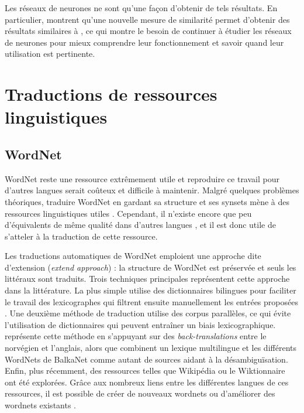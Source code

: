 
Les réseaux de neurones ne sont qu'une façon d'obtenir de tels résultats. En
particulier, \cite{levy2014linguistic} montrent qu'une nouvelle mesure de
similarité permet d'obtenir des résultats similaires à
\cite{mikolov2013efficient}, ce qui montre le besoin de continuer à étudier les
réseaux de neurones pour mieux comprendre leur fonctionnement et savoir quand
leur utilisation est pertinente.

\section{Traductions de ressources linguistiques}
\label{sec:translation}

\subsection{WordNet}

WordNet reste une ressource extrêmement utile et reproduire ce travail pour
d'autres langues serait coûteux et difficile à maintenir. Malgré quelques
problèmes théoriques, traduire WordNet en gardant sa structure et ses synsets
mène à des ressources linguistiques utiles
\citep{fellbaum2007connecting,demelo2008utility}. Cependant, il n'existe encore
que peu d'équivalents de même qualité dans d'autres langues
\citep{bond2012survey}, et il est donc utile de s'atteler à la traduction de
cette ressource.

Les traductions automatiques de WordNet emploient une approche dite d'extension
(\textit{extend approach}) : la structure de WordNet est préservée et seuls les
littéraux sont traduits. Trois techniques principales représentent cette
approche dans la littérature. La plus simple utilise des dictionnaires
bilingues pour faciliter le travail des lexicographes qui filtrent ensuite
manuellement les entrées proposées
\citep{vossen1998eurowordnet,pianta2002developing,tufis2004balkanet}. Une
deuxième méthode de traduction utilise des corpus parallèles, ce qui évite
l'utilisation de dictionnaires qui peuvent entraîner un biais lexicographique.
\cite{dyvik2004translations} représente cette méthode en s'appuyant sur des
\textit{back-translations} entre le norvégien et l'anglais, alors que
\citep{sagot2008construction} combinent un lexique multilingue et les
différents WordNets de BalkaNet comme autant de sources aidant à la
désambiguïsation. Enfin, plus récemment, des ressources telles que Wikipédia ou
le Wiktionnaire ont été explorées. Grâce aux nombreux liens entre les
différentes langues de ces ressources, il est possible de créer de nouveaux
wordnets \citep{demelo2009towards,navigli2010babelnet} ou d'améliorer des
wordnets existants \citep{hanoka2012wordnet}.

